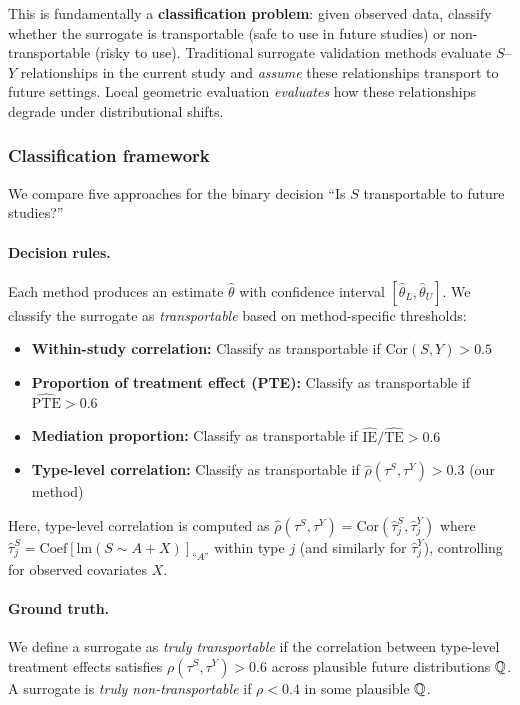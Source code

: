 \documentclass{article}
\begin{document}
This is fundamentally a \textbf{classification problem}: given observed data, classify whether the surrogate is transportable (safe to use in future studies) or non-transportable (risky to use). Traditional surrogate validation methods evaluate $S$--$Y$ relationships in the current study and \emph{assume} these relationships transport to future settings. Local geometric evaluation \emph{evaluates} how these relationships degrade under distributional shifts.

\subsubsection{Classification framework}

We compare five approaches for the binary decision ``Is $S$ transportable to future studies?''

\paragraph{Decision rules.} Each method produces an estimate $\hat{\theta}$ with confidence interval $[\hat{\theta}_L, \hat{\theta}_U]$. We classify the surrogate as \emph{transportable} based on method-specific thresholds:

\begin{itemize}
    \item \textbf{Within-study correlation:} Classify as transportable if $\text{Cor}(S, Y) > 0.5$
    \item \textbf{Proportion of treatment effect (PTE):} Classify as transportable if $\widehat{\text{PTE}} > 0.6$
    \item \textbf{Mediation proportion:} Classify as transportable if $\widehat{\text{IE}} / \widehat{\text{TE}} > 0.6$
    \item \textbf{Type-level correlation:} Classify as transportable if $\widehat{\rho}(\tau^S, \tau^Y) > 0.3$ (our method)
\end{itemize}

Here, type-level correlation is computed as $\widehat{\rho}(\tau^S, \tau^Y) = \text{Cor}(\hat{\tau}_j^S, \hat{\tau}_j^Y)$ where $\hat{\tau}_j^S = \text{Coef}[\text{lm}(S \sim A + X)]_{\text{``}A\text{''}}$ within type $j$ (and similarly for $\hat{\tau}_j^Y$), controlling for observed covariates $X$.

\paragraph{Ground truth.} We define a surrogate as \emph{truly transportable} if the correlation between type-level treatment effects satisfies $\rho(\tau^S, \tau^Y) > 0.6$ across plausible future distributions $\mathbb{Q}$. A surrogate is \emph{truly non-transportable} if $\rho < 0.4$ in some plausible $\mathbb{Q}$.
\end{document}

